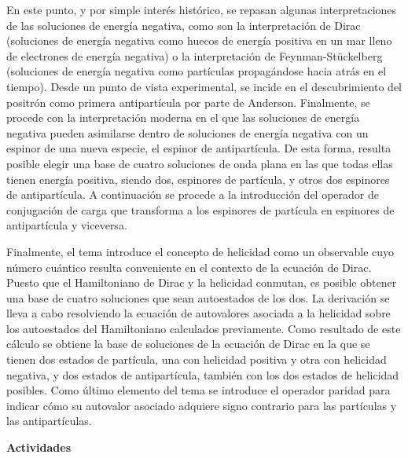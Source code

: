 En este punto, y por simple interés histórico, se repasan algunas interpretaciones de las soluciones de energía negativa, como son la interpretación de Dirac (soluciones de energía negativa como huecos de energía positiva en un mar lleno de electrones de energía negativa) o la interpretación de Feynman-Stückelberg (soluciones de energía negativa como partículas propagándose hacia atrás en el tiempo). Desde un punto de vista experimental, se incide en el descubrimiento del positrón como primera antipartícula por parte de Anderson. Finalmente, se procede con la interpretación moderna en el que las soluciones de energía negativa pueden asimilarse dentro de soluciones de energía negativa con un espinor de una nueva especie, el espinor de antipartícula. De esta forma, resulta posible elegir una base de cuatro soluciones de onda plana en las que todas ellas tienen energía positiva, siendo dos, espinores de partícula, y otros dos espinores de antipartícula. A continuación se procede a la introducción del operador de conjugación de carga que transforma a los espinores de partícula en espinores de antipartícula y viceversa.

Finalmente, el tema introduce el concepto de helicidad como un observable cuyo número cuántico resulta conveniente en el contexto de la ecuación de Dirac. Puesto que el Hamiltoniano de Dirac y la helicidad conmutan, es posible obtener una base de cuatro soluciones que sean autoestados de los dos. La derivación se lleva a cabo resolviendo la ecuación de autovalores asociada a la helicidad sobre los autoestados del Hamiltoniano calculados previamente. Como resultado de este cálculo se obtiene la base de soluciones de la ecuación de Dirac en la que se tienen dos estados de partícula, una con helicidad positiva y otra con helicidad negativa, y dos estados de antipartícula, también con los dos estados de helicidad posibles. Como último elemento del tema se introduce el operador paridad para indicar cómo su autovalor asociado adquiere signo contrario para las partículas y las antipartículas.

\textbf{Actividades}


